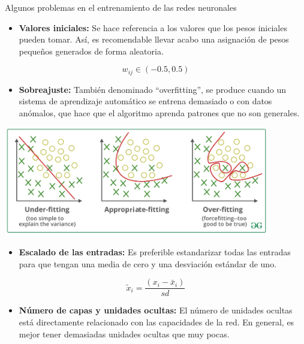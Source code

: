 \documentclass[
  ignorenonframetext,
]{beamer}
\providecommand{\tightlist}{%
  \setlength{\itemsep}{0pt}\setlength{\parskip}{0pt}}
\begin{document}
\begin{frame}{Algunos problemas en el entrenamiento de las redes
neuronales}
\protect\hypertarget{algunos-problemas-en-el-entrenamiento-de-las-redes-neuronales}{}

\begin{block}{}

\begin{itemize}
\tightlist
\item
  \textbf{Valores iniciales:} Se hace referencia a los valores que los
  pesos iniciales pueden tomar. Así, es recomendable llevar acabo una
  asignación de pesos pequeños generados de forma aleatoria.
\end{itemize}

\[w_{ij} \in (-0.5,0.5)\]

\begin{itemize}
\tightlist
\item
  \textbf{Sobreajuste:} También denominado ``overfitting'', se produce
  cuando un sistema de aprendizaje automático se entrena demasiado o con
  datos anómalos, que hace que el algoritmo aprenda patrones que no son
  generales.
\end{itemize}

\includegraphics[width=\textwidth,height=1.875in]{overfitting.png}

\begin{itemize}
\tightlist
\item
  \textbf{Escalado de las entradas:} Es preferible estandarizar todas
  las entradas para que tengan una media de cero y una desviación
  estándar de uno.
\end{itemize}

\[\tilde{x}_{i}=\displaystyle{\frac{(x_{i}-\bar{x}_{i})}{sd}}\]

\begin{itemize}
\tightlist
\item
  \textbf{Número de capas y unidades ocultas:} El número de unidades
  ocultas está directamente relacionado con las capacidades de la red.
  En general, es mejor tener demasiadas unidades ocultas que muy pocas.
\end{itemize}


\end{block}
\end{frame}
\end{document}
